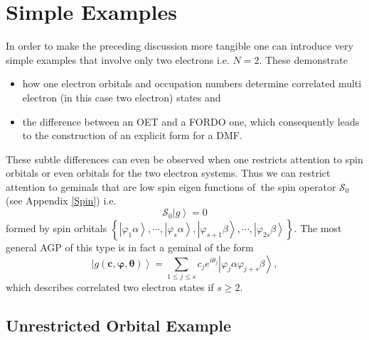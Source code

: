 \documentclass[aps,preprint]{revtex4}%
\begin{document}
\section{Simple Examples}

In order to make the preceding discussion more tangible one can introduce very
simple examples that involve only two electrons i.e. $N=2$. These demonstrate

\begin{itemize}
\item how one electron orbitals and occupation numbers determine correlated
multi electron (in this case two electron) states and

\item the difference between an OET and a FORDO one, which consequently leads
to the construction of an explicit form for a DMF.
\end{itemize}

These subtle differences can even be observed when one restricts attention to
spin orbitals or even orbitals for the two electron systems. Thus we can
restrict attention to geminals that are low spin eigen functions of $\ $the
spin operator $\mathcal{S}_{0}$ (see Appendix \ref{Spin}) i.e.
\begin{equation}
\mathcal{S}_{0}\left\vert g\right\rangle =0
\end{equation}
formed by spin orbitals $\left\{  \left\vert \varphi_{1}\alpha\right\rangle
,\cdots,\left\vert \varphi_{s}\alpha\right\rangle ,\left\vert \varphi
_{s+1}\beta\right\rangle ,\cdots,\left\vert \varphi_{2s}\beta\right\rangle
\right\}  $. The most general AGP of this type is in fact a geminal of the
form%
\begin{equation}
\left\vert g\left(  \boldsymbol{c},\boldsymbol{\varphi},\boldsymbol{\theta
}\right)  \right\rangle =\sum_{1\leq j\leq s}c_{j}e^{i\theta_{j}}\left\vert
\varphi_{j}\alpha\varphi_{j+s}\beta\right\rangle , \label{spinorbgem}%
\end{equation}
which describes correlated two electron states if $s\geq2$.

\subsection{Unrestricted Orbital Example}
\end{document}
